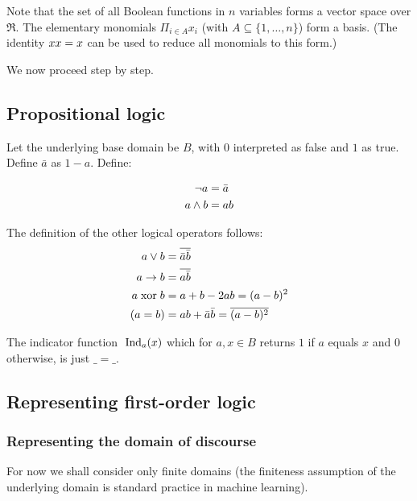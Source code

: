 \documentclass{article} %
\begin{document}
Note that the set of all Boolean functions in $n$ variables forms a vector space over $\Re$. The elementary monomials $\Pi_{i\in A} x_i$ (with $A \subseteq \{1,\ldots, n\}$) form a basis. (The identity $x x=x$ can be used to reduce all monomials to this form.) 

We now proceed step by step. 
\subsection{Propositional logic}\label{section:prop-logic}
Let the underlying base domain be $B$, with $0$ interpreted as false and $1$ as true. Define $\bar{a}$ as $1-a$. Define:

\begin{align*}
  \neg a &= \bar{a}\\
  a \wedge b &= a b
\end{align*}

The definition of the other logical operators follows:
  \begin{align*}
  a\vee b &= \overline{\bar{a}\bar{b}} \\
  a \rightarrow b &= \overline{a\bar{b}}\\
  a \;\mbox{xor}\; b &= a + b - 2ab=(a-b)^2\\
  (a = b) &=a b + \bar{a}\bar{b} =\overline{(a-b)^2}
  \end{align*}

The indicator function $\;\mbox{Ind}_a(x)$ which for $a,x \in B$ returns
$1$ if $a$ equals $x$ and $0$ otherwise, is just $\_=\_$.

\subsection{Representing first-order logic}

\subsubsection{Representing the domain of discourse}
For now we shall consider only finite domains (the finiteness assumption of the underlying domain is standard practice in machine learning).
\end{document}
